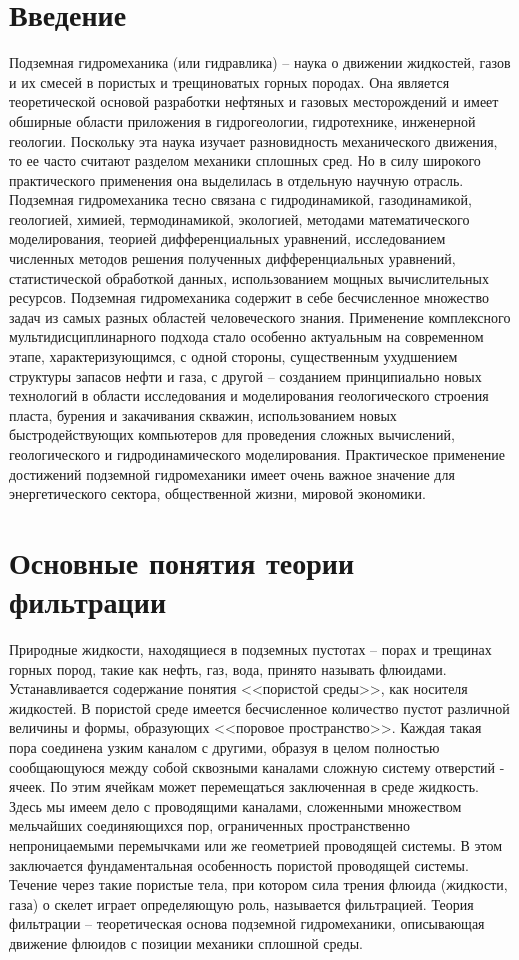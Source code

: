 \section{Введение}

Подземная гидромеханика (или гидравлика) -- наука о движении жидкостей, газов и их смесей в пористых и трещиноватых горных породах. Она является теоретической основой разработки нефтяных и газовых месторождений
и имеет обширные области приложения в гидрогеологии, гидротехнике, инженерной геологии. Поскольку эта наука изучает разновидность механического движения, то ее часто считают разделом механики сплошных сред.
Но в силу широкого практического применения она выделилась в отдельную научную отрасль. Подземная гидромеханика тесно связана с гидродинамикой, газодинамикой, геологией, химией, термодинамикой, экологией, 
методами математического моделирования, теорией дифференциальных уравнений, исследованием численных методов решения полученных дифференциальных уравнений, статистической обработкой данных, использованием мощных
вычислительных ресурсов.
Подземная гидромеханика содержит в себе бесчисленное множество задач из самых разных областей человеческого знания.
Применение комплексного мультидисциплинарного подхода стало особенно актуальным на современном этапе, характеризующимся, с одной стороны, существенным ухудшением структуры запасов нефти и газа, с другой -- созданием
принципиально новых технологий в области исследования и моделирования геологического строения пласта, бурения и закачивания скважин, использованием новых быстродействующих компьютеров для проведения сложных вычислений,
геологического и гидродинамического моделирования. Практическое применение достижений подземной гидромеханики имеет очень важное значение для энергетического сектора, общественной жизни, мировой экономики.

\newpage

\section{Основные понятия теории фильтрации}

Природные жидкости, находящиеся в подземных пустотах -- порах и трещинах горных пород, такие как нефть, газ, вода, принято называть флюидами. Устанавливается содержание понятия <<пористой среды>>, как
носителя жидкостей. В пористой среде имеется бесчисленное количество пустот различной величины и формы, образующих <<поровое пространство>>. Каждая такая пора соединена узким каналом с другими, образуя
в целом полностью сообщающуюся между собой сквозными каналами сложную систему отверстий - ячеек. По этим ячейкам может перемещаться заключенная в среде жидкость. Здесь мы имеем дело с проводящими каналами,
сложенными множеством мельчайших соединяющихся пор, ограниченных пространственно непроницаемыми перемычками или же геометрией проводящей системы. В этом заключается фундаментальная особенность пористой
проводящей системы.
Течение через такие пористые тела, при котором сила трения флюида (жидкости, газа) о скелет играет определяющую роль, называется фильтрацией.
Теория фильтрации -- теоретическая основа подземной гидромеханики, описывающая движение флюидов с позиции механики сплошной среды.


